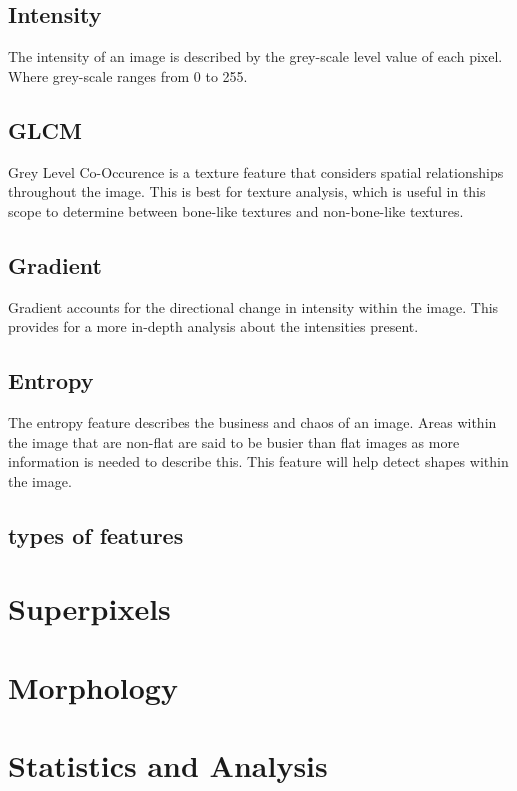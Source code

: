 \subsection{Intensity}
The intensity of an image is described by the grey-scale level value of each pixel. Where grey-scale ranges from 0 to 255. 
\subsection{GLCM}
Grey Level Co-Occurence is a texture feature that considers spatial relationships throughout the image. This is best for texture analysis, which is useful in this scope to determine between bone-like textures and non-bone-like textures. \cite{ref:glcm_1}
\subsection{Gradient}
Gradient accounts for the directional change in intensity within the image. This provides for a more in-depth analysis about the intensities present. \cite{ref:gradient_1} 
\subsection{Entropy}
The entropy feature describes the business and chaos of an image. Areas within the image that are non-flat are said to be busier than flat images as more information is needed to describe this. This feature will help detect shapes within the image. \cite{ref:ent_1}

	\subsection{types of features}
\section{Superpixels}
\section{Morphology}
\section{Statistics and Analysis}